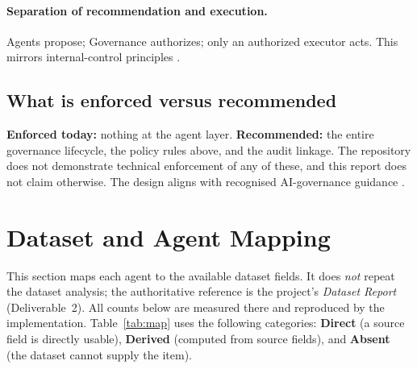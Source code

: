 \documentclass[11pt,a4paper]{article}
\begin{document}
\paragraph{Separation of recommendation and execution.} Agents propose; Governance authorizes; only an authorized executor acts. This mirrors internal-control principles \cite{coso2013,sox2002}.

\subsection{What is enforced versus recommended}
\textbf{Enforced today:} nothing at the agent layer. \textbf{Recommended:} the entire governance lifecycle, the policy rules above, and the audit linkage. The repository does not demonstrate technical enforcement of any of these, and this report does not claim otherwise. The design aligns with recognised AI-governance guidance \cite{nistAirmf2023,nistAi6001,iso42001}.

\section{Dataset and Agent Mapping}
This section maps each agent to the available dataset fields. It does \emph{not} repeat the dataset analysis; the authoritative reference is the project's \emph{Dataset Report} (Deliverable~2). All counts below are measured there and reproduced by the implementation. Table~\ref{tab:map} uses the following categories: \textbf{Direct} (a source field is directly usable), \textbf{Derived} (computed from source fields), and \textbf{Absent} (the dataset cannot supply the item).
\end{document}
